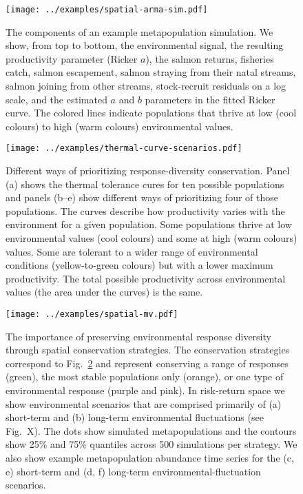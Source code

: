 \clearpage

\begin{figure}[htbp]
\centering
\texttt{[image: ../examples/spatial-arma-sim.pdf]}
\caption{The components of an example metapopulation simulation.  We show, from top to bottom, the environmental signal, the resulting productivity parameter (Ricker $a$), the salmon returns, fisheries catch, salmon escapement, salmon straying from their natal streams, salmon joining from other streams, stock-recruit residuals on a log scale, and the estimated $a$ and $b$ parameters in the fitted Ricker curve. The colored lines indicate populations that thrive at low (cool colours) to high (warm colours) environmental values.}
\label{f:sp-eg}
\end{figure}

\clearpage

\begin{figure}[htbp]
\centering
\texttt{[image: ../examples/thermal-curve-scenarios.pdf]}
\caption{Different ways of prioritizing response-diversity conservation. Panel (a) shows the thermal tolerance cures for ten possible populations and panels (b--e) show different ways of prioritizing four of those populations. The curves describe how productivity varies with the environment for a given population. Some populations thrive at low environmental values (cool colours) and some at high (warm colours) values. Some are tolerant to a wider range of environmental conditions (yellow-to-green colours) but with a lower maximum productivity. The total possible productivity across environmental values (the area under the curves) is the same.}
\label{f:curves}
\end{figure}

\clearpage

\begin{figure}[htbp]
\centering
\texttt{[image: ../examples/spatial-mv.pdf]}
\caption{The importance of preserving environmental response diversity through spatial conservation strategies. The conservation strategies correspond to Fig.~\ref{f:curves} and represent conserving a range of responses (green), the most stable populations only (orange), or one type of environmental response (purple and pink).  In risk-return space we show environmental scenarios that are comprised primarily of (a) short-term and (b) long-term environmental fluctuations (see Fig.~X). The dots show simulated metapopulations and the contours show 25\% and 75\% quantiles across 500 simulations per strategy. We also show example metapopulation abundance time series for the (c, e) short-term and (d, f) long-term  environmental-fluctuation scenarios.}
\label{f:sp-mv}
\end{figure}

